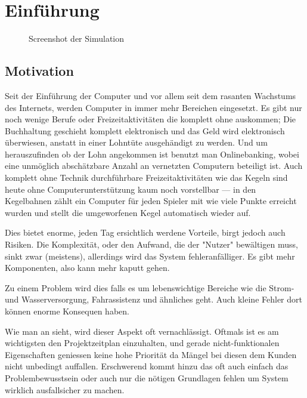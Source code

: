 \clearpage
\section{Einf{\"{u}}hrung}
\begin{figure}
	\centering
	\caption{Screenshot der Simulation}
	\label{fig:simulation}
\end{figure}

\subsection{Motivation} Seit der Einf{\"{u}}hrung der Computer und vor allem seit dem rasanten Wachstums des
Internets, werden Computer in immer mehr Bereichen eingesetzt. Es gibt nur noch wenige Berufe oder 
Freizeitaktivit{\"{a}}ten die komplett ohne auskommen; Die Buchhaltung geschieht komplett elektronisch und
das Geld wird elektronisch {\"{u}}berwiesen, anstatt in einer Lohnt{\"{u}}te ausgeh{\"{a}}ndigt zu werden.
Und um herauszufinden ob der Lohn angekommen ist benutzt man Onlinebanking, wobei eine
unm{\"{o}}glich absch{\"{a}}tzbare Anzahl an vernetzten Computern beteiligt ist. Auch komplett ohne Technik
durchf{\"{u}}hrbare Freizeitaktivit{\"{a}}ten wie das Kegeln sind heute ohne Computerunterst{\"{u}}tzung
kaum noch vorstellbar --- in den Kegelbahnen z{\"{a}}hlt ein Computer f{\"{u}}r jeden Spieler mit wie viele
Punkte erreicht wurden und stellt die umgeworfenen Kegel automatisch wieder auf.

Dies bietet enorme, jeden Tag ersichtlich werdene Vorteile, birgt jedoch auch Risiken. Die Komplexit{\"{a}}t,
oder den Aufwand, die der "Nutzer" bew{\"{a}}ltigen muss, sinkt zwar (meistens), allerdings wird das
System fehleranf{\"{a}}lliger. Es gibt mehr Komponenten, also kann mehr kaputt gehen.

Zu einem Problem wird dies falls es um lebenswichtige Bereiche wie die
Strom- und Wasserversorgung, Fahrassistenz und {\"{a}}hnliches geht. Auch kleine Fehler dort k{\"{o}}nnen
enorme Konsequen haben. 

Wie man an  sieht, wird dieser Aspekt oft vernachl{\"{a}}ssigt. Oftmals ist es am wichtigsten den
Projektzeitplan einzuhalten, und gerade nicht-funktionalen Eigenschaften geniessen keine hohe Priorit{\"{a}}t da M{\"{a}}ngel
bei diesen dem Kunden nicht unbedingt auffallen. Erschwerend kommt hinzu das oft auch einfach das Problembewusstsein oder auch nur die
n{\"{o}}tigen Grundlagen fehlen um System wirklich ausfallsicher zu machen.

